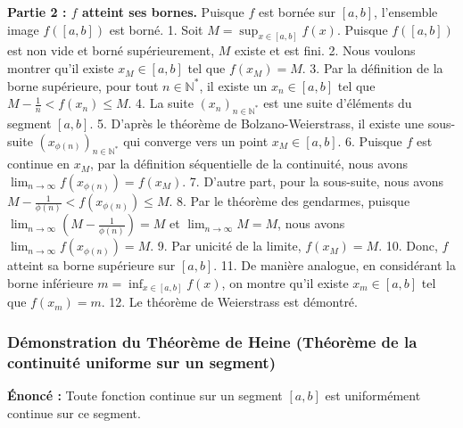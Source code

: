 \documentclass[12pt,a4paper]{report}
\begin{document}
\textbf{Partie 2 : $f$ atteint ses bornes.}
Puisque $f$ est bornée sur $[a, b]$, l'ensemble image $f([a, b])$ est borné.
1.  Soit $M = \sup_{x \in [a,b]} f(x)$. Puisque $f([a, b])$ est non vide et borné supérieurement, $M$ existe et est fini.
2.  Nous voulons montrer qu'il existe $x_M \in [a, b]$ tel que $f(x_M) = M$.
3.  Par la définition de la borne supérieure, pour tout $n \in \mathbb{N}^*$, il existe un $x_n \in [a, b]$ tel que $M - \frac{1}{n} < f(x_n) \le M$.
4.  La suite $(x_n)_{n \in \mathbb{N}^*}$ est une suite d'éléments du segment $[a, b]$.
5.  D'après le théorème de Bolzano-Weierstrass, il existe une sous-suite $(x_{\phi(n)})_{n \in \mathbb{N}^*}$ qui converge vers un point $x_M \in [a, b]$.
6.  Puisque $f$ est continue en $x_M$, par la définition séquentielle de la continuité, nous avons $\lim_{n \to \infty} f(x_{\phi(n)}) = f(x_M)$.
7.  D'autre part, pour la sous-suite, nous avons $M - \frac{1}{\phi(n)} < f(x_{\phi(n)}) \le M$.
8.  Par le théorème des gendarmes, puisque $\lim_{n \to \infty} (M - \frac{1}{\phi(n)}) = M$ et $\lim_{n \to \infty} M = M$, nous avons $\lim_{n \to \infty} f(x_{\phi(n)}) = M$.
9.  Par unicité de la limite, $f(x_M) = M$.
10. Donc, $f$ atteint sa borne supérieure sur $[a, b]$.
11. De manière analogue, en considérant la borne inférieure $m = \inf_{x \in [a,b]} f(x)$, on montre qu'il existe $x_m \in [a, b]$ tel que $f(x_m) = m$.
12. Le théorème de Weierstrass est démontré.

\subsubsection{Démonstration du Théorème de Heine (Théorème de la continuité uniforme sur un segment)}
\textbf{Énoncé :} Toute fonction continue sur un segment $[a, b]$ est uniformément continue sur ce segment.
\end{document}
